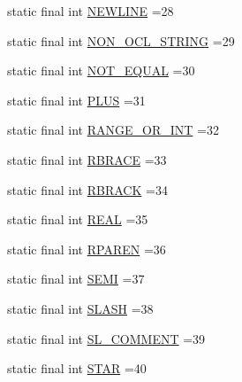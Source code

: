 \begin{DoxyCompactItemize}
\item 
static final int \hyperlink{classorg_1_1tzi_1_1use_1_1parser_1_1testsuite_1_1_test_suite_parser_a30321ed1ca2a6fefed0bbd6776e43f3e}{N\-E\-W\-L\-I\-N\-E} =28
\item 
static final int \hyperlink{classorg_1_1tzi_1_1use_1_1parser_1_1testsuite_1_1_test_suite_parser_a19e62d0882cb469671837e6bd0ecb9b2}{N\-O\-N\-\_\-\-O\-C\-L\-\_\-\-S\-T\-R\-I\-N\-G} =29
\item 
static final int \hyperlink{classorg_1_1tzi_1_1use_1_1parser_1_1testsuite_1_1_test_suite_parser_a49f015806ab09e93eabc11d337749063}{N\-O\-T\-\_\-\-E\-Q\-U\-A\-L} =30
\item 
static final int \hyperlink{classorg_1_1tzi_1_1use_1_1parser_1_1testsuite_1_1_test_suite_parser_a981cb1fb554c1293a2767fbccc92da9c}{P\-L\-U\-S} =31
\item 
static final int \hyperlink{classorg_1_1tzi_1_1use_1_1parser_1_1testsuite_1_1_test_suite_parser_af9f5f9bc6c996676144bf082cc5fd993}{R\-A\-N\-G\-E\-\_\-\-O\-R\-\_\-\-I\-N\-T} =32
\item 
static final int \hyperlink{classorg_1_1tzi_1_1use_1_1parser_1_1testsuite_1_1_test_suite_parser_a8bd62158f1951f16325a826112687c7d}{R\-B\-R\-A\-C\-E} =33
\item 
static final int \hyperlink{classorg_1_1tzi_1_1use_1_1parser_1_1testsuite_1_1_test_suite_parser_ac45e9d6bbf92633d834f9ab69104d525}{R\-B\-R\-A\-C\-K} =34
\item 
static final int \hyperlink{classorg_1_1tzi_1_1use_1_1parser_1_1testsuite_1_1_test_suite_parser_ab5b93bc96e8e9d98ea388fc73f54687a}{R\-E\-A\-L} =35
\item 
static final int \hyperlink{classorg_1_1tzi_1_1use_1_1parser_1_1testsuite_1_1_test_suite_parser_a498b66bb20067302450d84af11d4cb74}{R\-P\-A\-R\-E\-N} =36
\item 
static final int \hyperlink{classorg_1_1tzi_1_1use_1_1parser_1_1testsuite_1_1_test_suite_parser_a4fdeeb6caa4aa489a7bd71ade2716394}{S\-E\-M\-I} =37
\item 
static final int \hyperlink{classorg_1_1tzi_1_1use_1_1parser_1_1testsuite_1_1_test_suite_parser_a94ce099c5691965cbf208fa768c00b91}{S\-L\-A\-S\-H} =38
\item 
static final int \hyperlink{classorg_1_1tzi_1_1use_1_1parser_1_1testsuite_1_1_test_suite_parser_aa5e3538e570f5cef2be35d83fe5ec300}{S\-L\-\_\-\-C\-O\-M\-M\-E\-N\-T} =39
\item 
static final int \hyperlink{classorg_1_1tzi_1_1use_1_1parser_1_1testsuite_1_1_test_suite_parser_a93b8bfc83bb08a4efe62e15686e99d78}{S\-T\-A\-R} =40

\end{DoxyCompactItemize}
